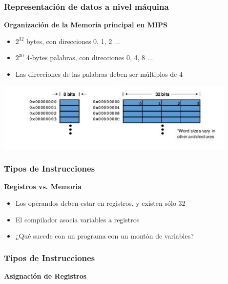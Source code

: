 \documentclass[aspectratio=169,compress]{beamer}
\begin{document}
\begin{footnotesize}
\begin{frame}
\frametitle{Representación de datos a nivel máquina}
\textbf{Organización de la Memoria principal en MIPS}
\begin{itemize}
	\item $2^{32}$ bytes, con direcciones 0, 1, 2 ... 
	\item $2^{30}$ 4-bytes palabras, con direcciones 0, 4, 8 ... 
	\item Las direcciones de las palabras deben ser múltiplos de 4
\end{itemize}
	\begin{center}
\includegraphics[scale=0.5]{images/memoria-mips.jpg} 
	\end{center}
\end{frame}


\begin{frame}[fragile]
\frametitle{Tipos de Instrucciones}
\begin{center}\textbf{Registros vs. Memoria}\end{center}

\begin{itemize}
\item Los operandos deben estar en registros, y existen sólo 32
\item El compilador asocia variables a registros
\item ¿Qué sucede con un programa con un montón de variables?
\end{itemize}
\end{frame}



\begin{frame}[fragile]
\frametitle{Tipos de Instrucciones}
\begin{center}\textbf{Asignación de Registros}\end{center}


\end{frame}
\end{footnotesize}
\end{document}
